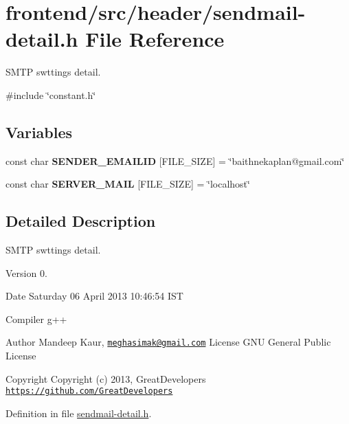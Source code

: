 \hypertarget{sendmail-detail_8h}{\section{frontend/src/header/sendmail-\/detail.h \-File \-Reference}
\label{d9/de2/sendmail-detail_8h}
}


\-S\-M\-T\-P swttings detail.  


{\ttfamily \#include \char`\"{}constant.\-h\char`\"{}}\*
\subsection*{\-Variables}
\begin{DoxyCompactItemize}
\item 
\hypertarget{sendmail-detail_8h_a6a17dd6df02d3a5118873bc84ce9801d}{const char {\bfseries \-S\-E\-N\-D\-E\-R\-\_\-\-E\-M\-A\-I\-L\-I\-D} \mbox{[}\-F\-I\-L\-E\-\_\-\-S\-I\-Z\-E\mbox{]} = \char`\"{}baithnekaplan@gmail.\-com\char`\"{}}\label{d9/de2/sendmail-detail_8h_a6a17dd6df02d3a5118873bc84ce9801d}

\item 
\hypertarget{sendmail-detail_8h_a5a43d9760874d06771eec35419dad507}{const char {\bfseries \-S\-E\-R\-V\-E\-R\-\_\-\-M\-A\-I\-L} \mbox{[}\-F\-I\-L\-E\-\_\-\-S\-I\-Z\-E\mbox{]} = \char`\"{}localhost\char`\"{}}\label{d9/de2/sendmail-detail_8h_a5a43d9760874d06771eec35419dad507}

\end{DoxyCompactItemize}


\subsection{\-Detailed \-Description}
\-S\-M\-T\-P swttings detail. \begin{DoxyVersion}{\-Version}
0. 
\end{DoxyVersion}
\begin{DoxyDate}{\-Date}
\-Saturday 06 \-April 2013 10\-:46\-:54 \-I\-S\-T\par
 \-Compiler g++
\end{DoxyDate}
\begin{DoxyAuthor}{\-Author}
\-Mandeep \-Kaur, \href{mailto:meghasimak@gmail.com}{\tt meghasimak@gmail.\-com} \-License \-G\-N\-U \-General \-Public \-License 
\end{DoxyAuthor}
\begin{DoxyCopyright}{\-Copyright}
\-Copyright (c) 2013, \-Great\-Developers \href{https://github.com/GreatDevelopers}{\tt https\-://github.\-com/\-Great\-Developers} 
\end{DoxyCopyright}


\-Definition in file \hyperlink{sendmail-detail_8h_source}{sendmail-\/detail.\-h}.

